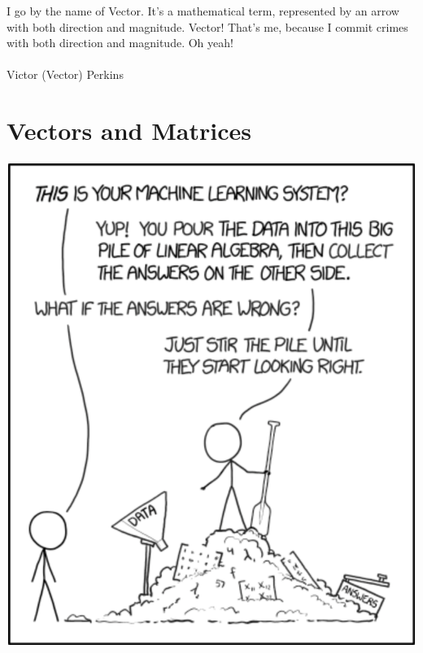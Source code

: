 \documentclass[oneside]{book}
\begin{document}
\pagebreak

\tableofcontents

\setcounter{tocdepth}{4}
\setcounter{secnumdepth}{4}

\pagebreak

\mainmatter

\begin{savequote}
I go by the name of Vector. It's a mathematical term, represented by an arrow with both direction and magnitude. Vector! That's me, because I commit crimes with both direction and magnitude. Oh yeah!
\\
\\
Victor (Vector) Perkins
\end{savequote}
\chapter{Vectors and Matrices}

    

\begin{savequote}
\includegraphics[scale=0.45]{Graphics/ml.png}
\end{savequote}
\end{document}
